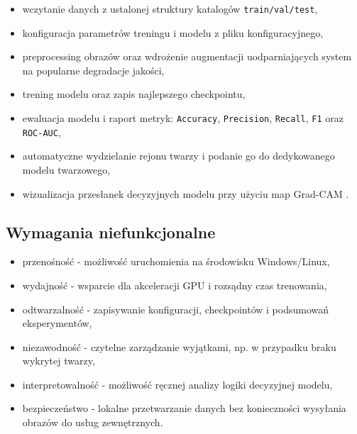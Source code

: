 \begin{itemize}
    \item wczytanie danych z ustalonej struktury katalogów \texttt{train/val/test},
    \item konfiguracja parametrów treningu i modelu z pliku konfiguracyjnego,
    \item preprocessing obrazów oraz wdrożenie augmentacji uodparniających system na popularne degradacje jakości,
    \item trening modelu oraz zapis najlepszego checkpointu,
    \item ewaluacja modelu i raport metryk: \texttt{Accuracy}, \texttt{Precision}, \texttt{Recall}, \texttt{F1} oraz \texttt{ROC-AUC},
    \item automatyczne wydzielanie rejonu twarzy i podanie go do dedykowanego modelu twarzowego,
    \item wizualizacja przesłanek decyzyjnych modelu przy użyciu map Grad-CAM \cite{selvaraju2017gradcam}.
\end{itemize}

\subsection{Wymagania niefunkcjonalne}

\begin{itemize}
    \item przenośność - możliwość uruchomienia na środowisku Windows/Linux,
    \item wydajność - wsparcie dla akceleracji GPU i rozsądny czas trenowania,
    \item odtwarzalność - zapisywanie konfiguracji, checkpointów i podsumowań eksperymentów,
    \item niezawodność - czytelne zarządzanie wyjątkami, np. w przypadku braku wykrytej twarzy,
    \item interpretowalność - możliwość ręcznej analizy logiki decyzyjnej modelu,
    \item bezpieczeństwo - lokalne przetwarzanie danych bez konieczności wysyłania obrazów do usług zewnętrznych.
\end{itemize}
